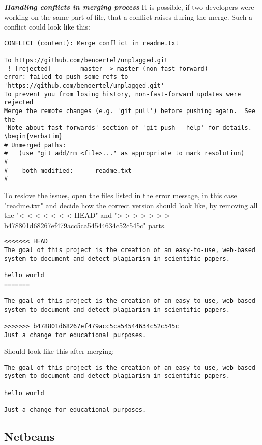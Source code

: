 \textbf{\textit{Handling conflicts in merging process}}
It is possible, if two developers were working on the same part of  file, that a conflict raises during the merge. Such a conflict could look like this:
\begin{verbatim}
CONFLICT (content): Merge conflict in readme.txt

To https://github.com/benoertel/unplagged.git
 ! [rejected]        master -> master (non-fast-forward)
error: failed to push some refs to 'https://github.com/benoertel/unplagged.git'
To prevent you from losing history, non-fast-forward updates were rejected
Merge the remote changes (e.g. 'git pull') before pushing again.  See the
'Note about fast-forwards' section of 'git push --help' for details.
\begin{verbatim}
# Unmerged paths:
#   (use "git add/rm <file>..." as appropriate to mark resolution)
#
#    both modified:      readme.txt
#
\end{verbatim}
To reslove the issues, open the files listed in the error message, in this case "readme.txt" and decide how the correct version should look like, by removing all the "< < < < < < <  HEAD" and "> > > > > > > b478801d68267ef479acc5ca54544634c52c545c" parts.

\begin{verbatim}
<<<<<<< HEAD
The goal of this project is the creation of an easy-to-use, web-based
system to document and detect plagiarism in scientific papers.

hello world
=======

The goal of this project is the creation of an easy-to-use, web-based
system to document and detect plagiarism in scientific papers.

>>>>>>> b478801d68267ef479acc5ca54544634c52c545c
Just a change for educational purposes.
\end{verbatim}

Should look like this after merging:
\begin{verbatim}
The goal of this project is the creation of an easy-to-use, web-based
system to document and detect plagiarism in scientific papers.

hello world

Just a change for educational purposes.
\end{verbatim}

\subsection{Netbeans}

